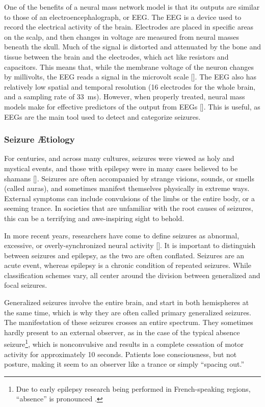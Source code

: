 One of the benefits of a neural mass network model is that its outputs are similar to those of an electroencephalograph, or EEG.
The EEG is a device used to record the electrical activity of the brain.
Electrodes are placed in specific areas on the scalp, and then changes in voltage are measured from neural masses beneath the skull.
Much of the signal is distorted and attenuated by the bone and tissue between the brain and the electrodes, which act like resistors and capacitors.
This means that, while the membrane voltage of the neuron changes by millivolts, the EEG reads a signal in the microvolt scale [].
The EEG also has relatively low spatial and temporal resolution (16 electrodes for the whole brain, and a sampling rate of \SI{33}{\ms}).
However, when properly treated, neural mass models make for effective predictors of the output from EEGs [].
This is useful, as EEGs are the main tool used to detect and categorize seizures.

\subsubsection{Seizure \AE tiology}
\label{sec:intro_seizures_aetiology}
For centuries, and across many cultures, seizures were viewed as holy and mystical events, and those with epilepsy were in many cases believed to be shamans [].
Seizures are often accompanied by strange visions, sounds, or smells (called auras), and sometimes manifest themselves physically in extreme ways.
External symptoms can include convulsions of the limbs or the entire body, or a seeming trance.
In societies that are unfamiliar with the root causes of seizures, this can be a terrifying and awe-inspiring sight to behold.

In more recent years, researchers have come to define seizures as abnormal, excessive, or overly-synchronized neural activity [].
It is important to distinguish between seizures and epilepsy, as the two are often conflated.
Seizures are an acute event, whereas epilepsy is a chronic condition of repeated seizures.
While classification schemes vary, all center around the division between generalized and focal seizures.

Generalized seizures involve the entire brain, and start in both hemispheres at the same time, which is why they are often called primary generalized seizures.
The manifestation of these seizures crosses an entire spectrum.
They sometimes hardly present to an external observer, as in the case of the typical absence seizure\footnote{Due to early epilepsy research being performed in French-speaking regions, ``absence'' is pronounced .}, which is nonconvulsive and results in a complete cessation of motor activity for approximately 10 seconds.
Patients lose consciousness, but not posture, making it seem to an observer like a trance or simply ``spacing out.''

